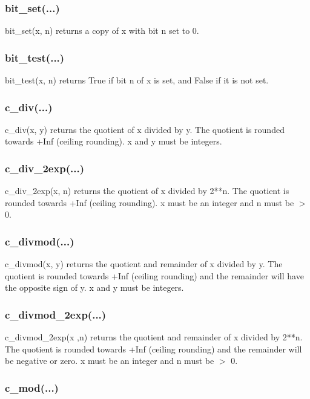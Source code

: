 \subsubsection{bit\_set(...)}

bit\_set(x, n) returns a copy of x with bit n set to 0.

\subsubsection{bit\_test(...)}

bit\_test(x, n) returns True if bit n of x is set, and False if it is not set.

\subsubsection{c\_div(...)}

c\_div(x, y) returns the quotient of x divided by y. The quotient is rounded towards +Inf (ceiling
rounding). x and y must be integers.

\subsubsection{c\_div\_2exp(...)}

c\_div\_2exp(x, n) returns the quotient of x divided by 2**n. The quotient is rounded towards +Inf
(ceiling rounding). x must be an integer and n must be $>$ 0.

\subsubsection{c\_divmod(...)}

c\_divmod(x, y) returns the quotient and remainder of x divided by y. The quotient is rounded
towards +Inf (ceiling rounding) and the remainder will have the opposite sign of y. x and y must
be integers.

\subsubsection{c\_divmod\_2exp(...)}

c\_divmod\_2exp(x ,n) returns the quotient and remainder of x divided by 2**n. The quotient is
rounded towards +Inf (ceiling rounding) and the remainder will be negative or zero. x must be
an integer and n must be $>$ 0.

\subsubsection{c\_mod(...)}


